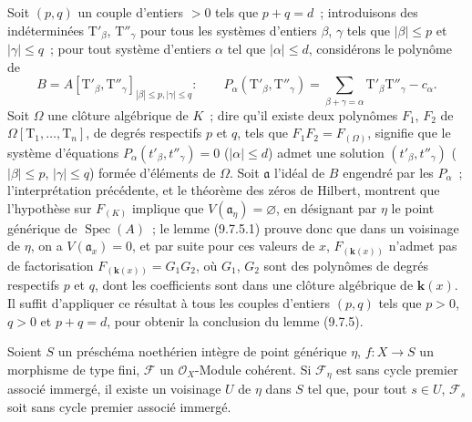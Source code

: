 
Soit $(p,q)$ un couple d'entiers $>0$ tels que $p+q=d$~; introduisons des
indéterminées $\mathrm T'_\beta$, $\mathrm T''_\gamma$ pour tous les systèmes
d'entiers $\beta$, $\gamma$ tels que $|\beta|\leqslant p$ et
$|\gamma|\leqslant q$~; pour tout système d'entiers $\alpha$ tel que
$|\alpha|\leqslant d$, considérons le polynôme de
\[
B=A[\mathrm T'_\beta,\mathrm T''_\gamma]_{|\beta|\leqslant p,
  |\gamma|\leqslant q}:
\qquad
P_\alpha(\mathrm T'_\beta,\mathrm T''_\gamma)
=\sum_{\beta+\gamma=\alpha}\mathrm T'_\beta\mathrm T''_\gamma-c_\alpha.
\]
Soit $\Omega$ une clôture algébrique de $K$~; dire qu'il existe deux polynômes
$F_1$, $F_2$ de $\Omega[\mathrm T_1,\ldots,\mathrm T_n]$, de degrés respectifs
$p$ et $q$, tels que $F_1F_2=F_{(\Omega)}$, signifie que le système d'équations
$P_\alpha(t'_\beta,t''_\gamma)=0$ ($|\alpha|\leqslant d$) admet une solution
$(t'_\beta,t''_\gamma)$ ($|\beta|\leqslant p$, $|\gamma|\leqslant q$) formée
d'éléments de $\Omega$. Soit $\mathfrak a$ l'idéal de $B$ engendré par les
$P_\alpha$~; l'interprétation précédente, et le théorème des zéros de Hilbert,
montrent que l'hypothèse sur $F_{(K)}$ implique que
$V(\mathfrak a_\eta)=\varnothing$, en désignant par $\eta$ le point générique de
$\operatorname{Spec}(A)$~; le lemme (9.7.5.1) prouve donc que dans un voisinage
de $\eta$, on a $V(\mathfrak a_x)=0$, et par suite pour ces valeurs de $x$,
$F_{(\boldsymbol{k}(x))}$ n'admet pas de factorisation
$F_{(\boldsymbol{k}(x))}=G_1G_2$, où $G_1$, $G_2$ sont des polynômes de degrés
respectifs $p$ et $q$, dont les coefficients sont dans une clôture algébrique
de $\boldsymbol{k}(x)$. Il suffit d'appliquer ce résultat à tous les couples
d'entiers $(p,q)$ tels que $p>0$, $q>0$ et $p+q=d$, pour obtenir la conclusion
du lemme (9.7.5).

\begin{proposition}[9.7.6]
\label{IV.9.7.6-fr}
Soient $S$ un préschéma noethérien intègre de point générique $\eta$, $f:X\to S$
un morphisme de type fini, $\mathcal F$ un $\mathcal O_X$-Module cohérent. Si
$\mathcal F_\eta$ est sans cycle premier associé immergé, il existe un voisinage
$U$ de $\eta$ dans $S$ tel que, pour tout $s\in U$, $\mathcal F_s$ soit sans cycle
premier associé immergé.
\end{proposition}

